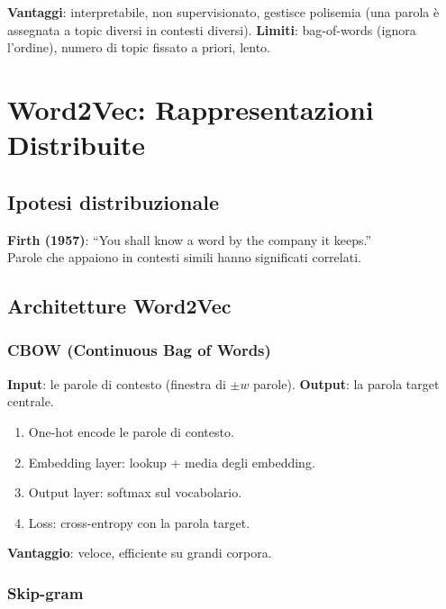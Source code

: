 \documentclass[12pt,a4paper]{article}
\begin{document}
\textbf{Vantaggi}: interpretabile, non supervisionato, gestisce polisemia (una parola è assegnata a topic diversi in contesti diversi). \textbf{Limiti}: bag-of-words (ignora l'ordine), numero di topic fissato a priori, lento.

\section{Word2Vec: Rappresentazioni Distribuite}

\subsection{Ipotesi distribuzionale}

\begin{defbox}
\textbf{Firth (1957)}: ``You shall know a word by the company it keeps.'' \\
Parole che appaiono in contesti simili hanno significati correlati.
\end{defbox}

\subsection{Architetture Word2Vec}

\subsubsection{CBOW (Continuous Bag of Words)}

\textbf{Input}: le parole di contesto (finestra di $\pm w$ parole). \textbf{Output}: la parola target centrale.

\begin{enumerate}[leftmargin=1.5em, label=\arabic*.]
  \item One-hot encode le parole di contesto.
  \item Embedding layer: lookup + media degli embedding.
  \item Output layer: softmax sul vocabolario.
  \item Loss: cross-entropy con la parola target.
\end{enumerate}

\textbf{Vantaggio}: veloce, efficiente su grandi corpora.

\subsubsection{Skip-gram}
\end{document}

